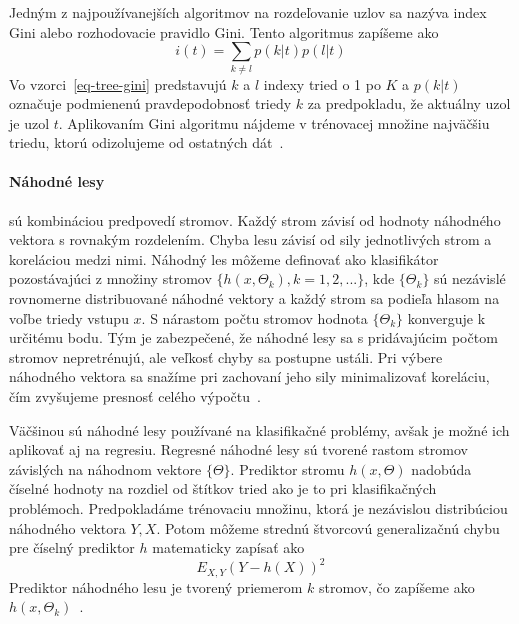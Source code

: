 \documentclass[a4paper,slovak,12pt,appendix]{article}
\begin{document}
Jedným z najpoužívanejších algoritmov na rozdeľovanie uzlov sa nazýva index
Gini alebo rozhodovacie pravidlo Gini. Tento algoritmus zapíšeme ako
\begin{equation}
  i(t) = \sum_{k \neq l} p(k|t) p(l|t)
  \label{eq-tree-gini}
\end{equation}
Vo vzorci~\ref{eq-tree-gini} predstavujú $k$ a $l$ indexy tried o 1 po $K$ a
$p(k|t)$ označuje podmienenú pravdepodobnosť triedy $k$ za predpokladu, že
aktuálny uzol je uzol $t$. Aplikovaním Gini algoritmu nájdeme v trénovacej
množine najväčšiu triedu, ktorú odizolujeme od ostatných dát~\cite{Bel2009}.


\paragraph{Náhodné lesy} sú kombináciou predpovedí stromov. Každý strom závisí
od hodnoty náhodného vektora s rovnakým rozdelením. Chyba lesu závisí od sily
jednotlivých strom a koreláciou medzi nimi. Náhodný les môžeme definovať ako
klasifikátor pozostávajúci z množiny stromov $\{h(x, \Theta_k), k=1, 2, ... \}$,
kde $\{\Theta_k\}$ sú nezávislé rovnomerne distribuované náhodné vektory a každý
strom sa podieľa hlasom na voľbe triedy vstupu $x$. S nárastom počtu stromov
hodnota $\{\Theta_k\}$ konverguje k určitému bodu. Tým je zabezpečené, že
náhodné lesy sa s pridávajúcim počtom stromov nepretrénujú, ale veľkosť chyby
sa postupne ustáli. Pri výbere náhodného vektora sa snažíme pri zachovaní jeho
sily minimalizovať koreláciu, čím zvyšujeme presnosť celého
výpočtu~\cite{Breiman2001}.

Väčšinou sú náhodné lesy používané na klasifikačné problémy, avšak je možné ich
aplikovať aj na regresiu. Regresné náhodné lesy sú tvorené rastom stromov
závislých na náhodnom vektore $\{\Theta\}$. Prediktor stromu $h(x, \Theta)$
nadobúda číselné hodnoty na rozdiel od štítkov tried ako je to pri klasifikačných
problémoch. Predpokladáme trénovaciu množinu, ktorá je nezávislou distribúciou
náhodného vektora $Y, X$. Potom môžeme strednú štvorcovú generalizačnú chybu
pre číselný prediktor $h$ matematicky zapísať ako
\begin{equation}
  E_{X, Y} (Y - h(X))^2
  \label{eq-random-error}
\end{equation}
Prediktor náhodného lesu je tvorený priemerom $k$ stromov, čo zapíšeme ako
$h(x, \Theta_k)$~\cite{Breiman2001}.
\end{document}
